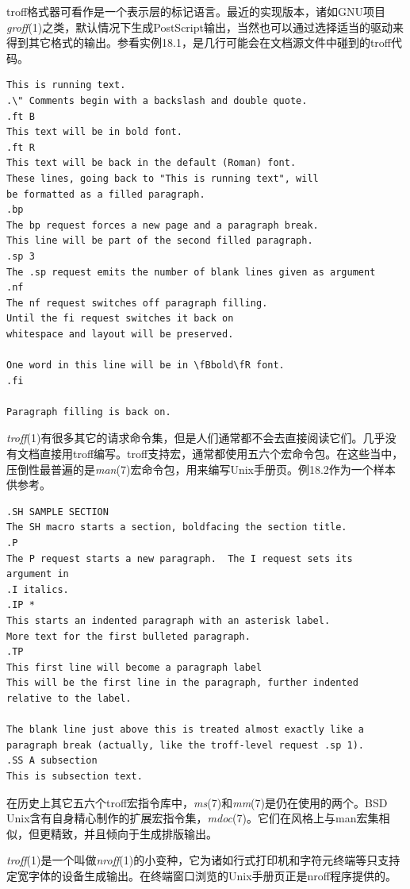 \documentclass[12pt,oneside]{book}
\begin{document}
troff格式器可看作是一个表示层的标记语言。最近的实现版本，诸如GNU项目\textit{groff}(1)之类，默认情况下生成PostScript输出，当然也可以通过选择适当的驱动来得到其它格式的输出。参看实例18.1，是几行可能会在文档源文件中碰到的troff代码。
\begin{Verbatim}[label=例18.1  groff(1)标记实例]
This is running text.
.\" Comments begin with a backslash and double quote.
.ft B
This text will be in bold font.
.ft R
This text will be back in the default (Roman) font.
These lines, going back to "This is running text", will 
be formatted as a filled paragraph.
.bp
The bp request forces a new page and a paragraph break.
This line will be part of the second filled paragraph.
.sp 3
The .sp request emits the number of blank lines given as argument
.nf
The nf request switches off paragraph filling.
Until the fi request switches it back on
whitespace and layout will be preserved.

One word in this line will be in \fBbold\fR font.
.fi

Paragraph filling is back on.
\end{Verbatim}


\textit{troff}(1)有很多其它的请求命令集，但是人们通常都不会去直接阅读它们。几乎没有文档直接用troff编写。troff支持宏，通常都使用五六个宏命令包。在这些当中，压倒性最普遍的是\textit{man}(7)宏命令包，用来编写Unix手册页。例18.2作为一个样本供参考。
\begin{Verbatim}[label=例18.2 man标记实例]
.SH SAMPLE SECTION
The SH macro starts a section, boldfacing the section title.  
.P
The P request starts a new paragraph.  The I request sets its 
argument in
.I italics.
.IP *
This starts an indented paragraph with an asterisk label.
More text for the first bulleted paragraph.
.TP
This first line will become a paragraph label
This will be the first line in the paragraph, further indented
relative to the label.

The blank line just above this is treated almost exactly like a
paragraph break (actually, like the troff-level request .sp 1).
.SS A subsection
This is subsection text. 
\end{Verbatim}

在历史上其它五六个troff宏指令库中，\textit{ms}(7)和\textit{mm}(7)是仍在使用的两个。BSD Unix含有自身精心制作的扩展宏指令集，\textit{mdoc}(7)。它们在风格上与man宏集相似，但更精致，并且倾向于生成排版输出。

\textit{troff}(1)是一个叫做\textit{nroff}(1)的小变种，它为诸如行式打印机和字符元终端等只支持定宽字体的设备生成输出。在终端窗口浏览的Unix手册页正是nroff程序提供的。
\end{document}
